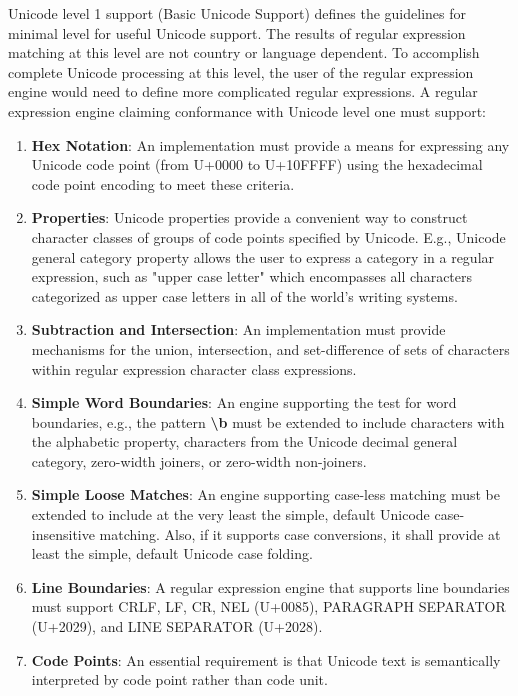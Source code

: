 Unicode level 1 support (Basic Unicode Support) defines the guidelines for minimal level for useful Unicode support. The results of regular expression matching at this level are not country or language dependent. To accomplish complete Unicode processing at this level, the user of the regular expression engine would need to define more complicated regular expressions. A regular expression engine claiming conformance with Unicode level one must support:

\begin{enumerate}
    \item \textbf{Hex Notation}: An implementation must provide a means for expressing any Unicode code point (from U+0000 to U+10FFFF) using the hexadecimal code point encoding to meet these criteria.
    \item \textbf{Properties}: Unicode properties provide a convenient way to construct character classes of groups of code points specified by Unicode. E.g., Unicode general category property allows the user to express a category in a regular expression, such as "upper case letter" which encompasses all characters categorized as upper case letters in all of the world's writing systems.
    \item \textbf{Subtraction and Intersection}: An implementation must provide mechanisms for the union, intersection, and set-difference of sets of characters within regular expression character class expressions.
    \item \textbf{Simple Word Boundaries}: An engine supporting the test for word boundaries, e.g., the pattern \textbf{\textbackslash b} must be extended to include characters with the alphabetic property, characters from the Unicode decimal general category, zero-width joiners, or zero-width non-joiners.
    \item \textbf{Simple Loose Matches}: An engine supporting case-less matching must be extended to include at the very least the simple, default Unicode case-insensitive matching. Also, if it supports case conversions, it shall provide at least the simple, default Unicode case folding.
    \item \textbf{Line Boundaries}: A regular expression engine that supports line boundaries must support CRLF, LF, CR, NEL (U+0085), PARAGRAPH SEPARATOR (U+2029), and LINE SEPARATOR (U+2028).
    \newpage
    \item \textbf{Code Points}: An essential requirement is that Unicode text is semantically interpreted by code point rather than code unit.
\end{enumerate}

